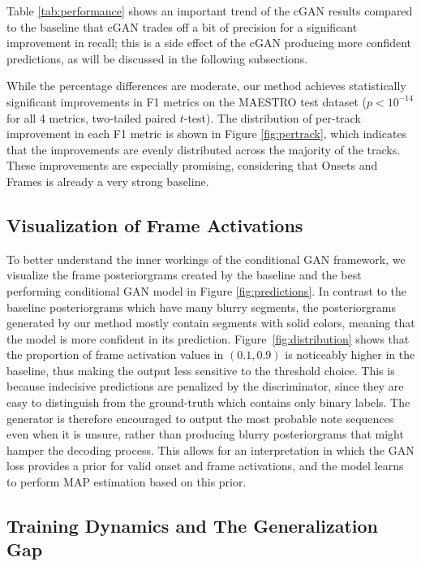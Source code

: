 Table \ref{tab:performance} shows an important trend of the cGAN results compared to the baseline that cGAN trades off a bit of precision for a significant improvement in recall; this is a side effect of the cGAN producing more confident predictions, as will be discussed in the following subsections.

While the percentage differences are moderate, our method achieves statistically significant improvements in F1 metrics on the MAESTRO test dataset ($p < 10^{-14}$ for all 4 metrics, two-tailed paired $t$-test).
The distribution of per-track improvement in each F1 metric is shown in Figure \ref{fig:pertrack}, which indicates that the improvements are evenly distributed across the majority of the tracks.
These improvements are especially promising, considering that Onsets and Frames is already a very strong baseline.

\subsection{Visualization of Frame Activations}

To better understand the inner workings of the conditional GAN framework, we visualize the frame posteriorgrams created by the baseline and the best performing conditional GAN model in Figure \ref{fig:predictions}.
In contrast to the baseline posteriorgrams which have many blurry segments, the posteriorgrams generated by our method mostly contain segments with solid colors, meaning that the model is more confident in its prediction.
Figure~\ref{fig:distribution} shows that the proportion of frame activation values in $(0.1, 0.9)$ is noticeably higher in the baseline, thus making the output less sensitive to the threshold choice.
This is because indecisive predictions are penalized by the discriminator, since they are easy to distinguish from the ground-truth which contains only binary labels.
The generator is therefore encouraged to output the most probable note sequences even when it is unsure, rather than producing blurry posteriorgrams that might hamper the decoding process.
This allows for an interpretation in which the GAN loss provides a prior for valid onset and frame activations, and the model learns to perform MAP estimation based on this prior.


\subsection{Training Dynamics and The Generalization Gap}

